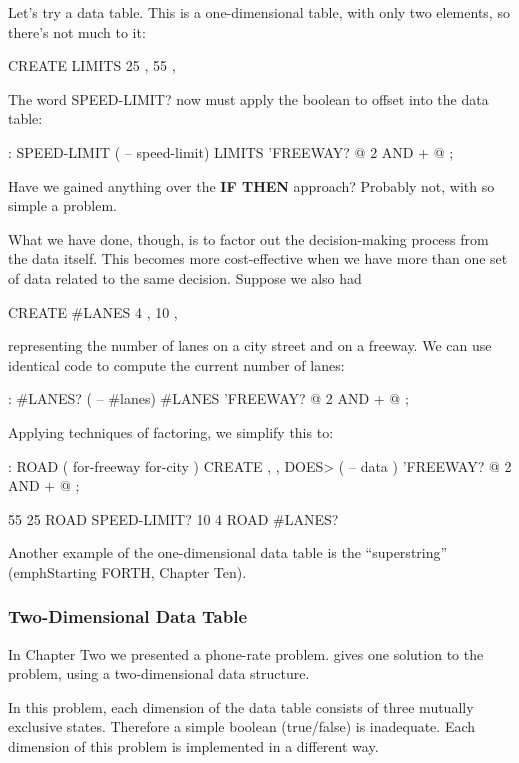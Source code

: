 Let's try a data table. This is a one-dimensional table, with only two
elements, so there's not much to it:

\begin{Code}
CREATE LIMITS   25 ,  55 ,
\end{Code}
The word SPEED-LIMIT? now must apply the boolean to offset into
the data table:

\begin{Code}
: SPEED-LIMIT  ( -- speed-limit)
     LIMITS  'FREEWAY? @  2 AND  +  @ ;
\end{Code}
Have we gained anything over the \textbf{IF THEN} approach? Probably not,
with so simple a problem.

What we have done, though, is to factor out the decision-making
process from the data itself. This becomes more cost-effective when we
have more than one set of data related to the same decision. Suppose we
also had

\begin{Code}
CREATE #LANES   4 ,  10 ,
\end{Code}
representing the number of lanes on a city street and on a freeway. We
can use identical code to compute the current number of lanes:

\begin{Code}
: #LANES?  ( -- #lanes)
     #LANES  'FREEWAY? @  2 AND  +  @ ;
\end{Code}
Applying techniques of factoring, we simplify this to:

\begin{Code}
: ROAD  ( for-freeway for-city ) CREATE , ,
     DOES> ( -- data )  'FREEWAY? @  2 AND  +  @ ;

55 25 ROAD SPEED-LIMIT?
10  4 ROAD #LANES?
\end{Code}
Another example of the one-dimensional data table is the ``superstring''
(emph{Starting FORTH}, Chapter Ten).

\subsubsection{Two-Dimensional Data Table}
In Chapter Two we presented a phone-rate problem.  gives one
solution to the problem, using a two-dimensional data structure.

In this problem, each dimension of the data table consists of three
mutually exclusive states. Therefore a simple boolean (true/false) is
inadequate. Each dimension of this problem is implemented in a different
way.

